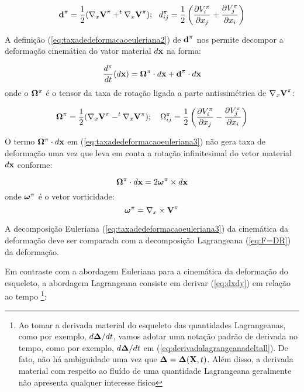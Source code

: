 \documentclass[
	11pt, %
	fleqn, %
	a4paper, %
]{LegrandOrangeBook}
\begin{document}
\begin{equation}
	\label{eq:taxadedeformacaoeuleriana2}	
\textbf{d}^{\pi} = \dfrac{1}{2}(\nabla_x \textbf{V}^{\pi} + ^{t}\nabla_x \textbf{V}^{\pi}); ~~ d^\pi_{ij} =  \dfrac{1}{2} \left(\dfrac{\partial V_i^\pi}{\partial x_j} + \dfrac{\partial V_j^\pi}{\partial x_i}\right)
\end{equation}

A definição (\ref{eq:taxadedeformacaoeuleriana2}) de $\textbf{d}^{\pi}$ nos permite decompor a deformação cinemática do vator material $d\textbf{x}$ na forma:

\begin{equation}
	\label{eq:taxadedeformacaoeuleriana3}	
	\dfrac{d^\pi}{dt}(d\textbf{x}) = \bm{\Omega}^\pi \cdot d\textbf{x} + \textbf{d}^\pi \cdot d\textbf{x}
\end{equation}
onde o $\bm{\Omega}^\pi$ é o tensor da taxa de rotação ligada a parte antissimétrica de $\nabla_x \textbf{V}^\pi$:

\begin{equation}
	\label{eq:taxadedeformacaoeuleriana4}	
\bm{\Omega}^\pi = \dfrac{1}{2}(\nabla_x \textbf{V}^{\pi} - ^{t}\nabla_x \textbf{V}^{\pi}); ~~~ \Omega^\pi_{ij} = \dfrac{1}{2}\left(\dfrac{\partial V_i^\pi}{\partial x_j}-\dfrac{\partial V_j^\pi}{\partial x_i} \right)
\end{equation}

O termo $\bm{\Omega}^\pi \cdot d\textbf{x}$ em (\ref{eq:taxadedeformacaoeuleriana3}) não gera taxa de deformação uma vez que leva em conta a rotação infinitesimal do vetor material $d\textbf{x}$ conforme:

\begin{equation}
	\label{eq:taxadedeformacaoeuleriana5}	
	\bm{\Omega}^\pi \cdot d\textbf{x} = 2 \bm{\omega}^\pi \times d\textbf{x}
\end{equation}
onde $\bm{\omega}^\pi$ é o vetor vorticidade:
\begin{equation}
	\label{eq:vetorvorticidade}	
	\bm{\omega}^\pi = \nabla_x \times \textbf{V}^\pi
\end{equation}

A decomposição Euleriana (\ref{eq:taxadedeformacaoeuleriana3}) da cinemática da deformação deve ser comparada com a decomposição Lagrangeana (\ref{eq:F=DR}) da deformação.

Em contraste com a abordagem Euleriana para a cinemática da deformação do esqueleto, a abordagem Lagrangeana consiste em derivar (\ref{eq:dxdy}) em relação ao tempo \footnote{Ao tomar a derivada material do esqueleto das quantidades Lagrangeanas, como por exemplo, $d\bm{\Delta}/dt$, vamos adotar uma notação padrão de derivada no tempo, como por exemplo, $d\bm{\Delta}/dt$ em (\ref{eq:derivadalagrangeanadeltall}). De fato, não há ambiguidade uma vez que $\bm{\Delta} = \bm{\Delta}(\textbf{X},t)$. Além disso, a derivada material com respeito ao fluído de uma quantidade Lagrangeana geralmente não apresenta qualquer interesse físico}:
\end{document}

